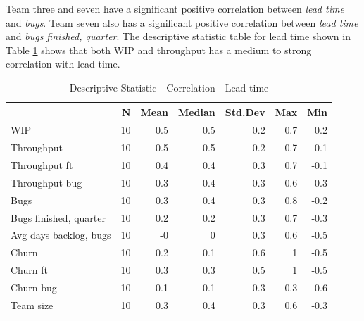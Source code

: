 \documentclass[UKenglish]{ifimaster}  %
\begin{document}
Team three and seven have a significant positive correlation between \textit{lead time} and \textit{bugs}. Team seven also has a significant positive correlation between \textit{lead time} and \textit{bugs finished, quarter}. The descriptive statistic table for lead time shown in Table \ref{DS:corr:LT} shows that both WIP and throughput has a medium to strong correlation with lead time. 
\begin{table}[!htbp]
 \centering
 \begin{tabular}{ | l | r | r | r | r | r | r | }
 \hline
 & \bf{N} & \bf{Mean} & \bf{Median} & \bf{Std.Dev} & \bf{Max} & \bf{Min} \\ \hline
WIP  & 10 & 0.5 & 0.5 & 0.2 & 0.7 & 0.2\\ \hline
Throughput  & 10 & 0.5 & 0.5 & 0.2 & 0.7 & 0.1\\ \hline
Throughput ft  & 10 & 0.4 & 0.4 & 0.3 & 0.7 & -0.1\\ \hline
Throughput bug  & 10 & 0.3 & 0.4 & 0.3 & 0.6 & -0.3\\ \hline
Bugs  & 10 & 0.3 & 0.4 & 0.3 & 0.8 & -0.2\\ \hline
Bugs finished, quarter  & 10 & 0.2 & 0.2 & 0.3 & 0.7 & -0.3\\ \hline
Avg days backlog, bugs  & 10 & -0 & 0 & 0.3 & 0.6 & -0.5\\ \hline
Churn  & 10 & 0.2 & 0.1 & 0.6 & 1 & -0.5\\ \hline
Churn ft  & 10 & 0.3 & 0.3 & 0.5 & 1 & -0.5\\ \hline
Churn bug  & 10 & -0.1 & -0.1 & 0.3 & 0.3 & -0.6\\ \hline
Team size  & 10 & 0.3 & 0.4 & 0.3 & 0.6 & -0.3\\ \hline
\end{tabular}
 \caption{Descriptive Statistic - Correlation - Lead time}
 \label{DS:corr:LT}
 \end{table}
\end{document}
